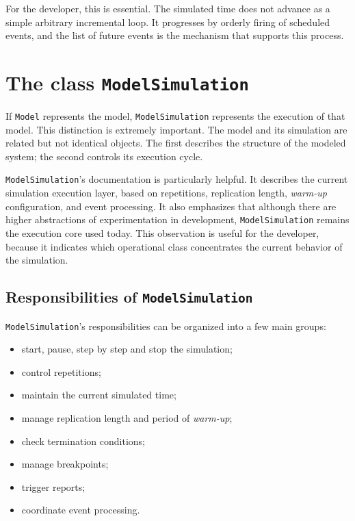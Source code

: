 For the developer, this is essential. The simulated time does not advance as a simple arbitrary incremental loop. It progresses by orderly firing of scheduled events, and the list of future events is the mechanism that supports this process.

\section{The class \texttt{ModelSimulation}}
\label{sec:cap7_classe_modelsimulation}

If \texttt{Model} represents the model, \texttt{ModelSimulation} represents the execution of that model. This distinction is extremely important. The model and its simulation are related but not identical objects. The first describes the structure of the modeled system; the second controls its execution cycle.

\texttt{ModelSimulation}'s documentation is particularly helpful. It describes the current simulation execution layer, based on repetitions, replication length, \textit{warm-up} configuration, and event processing. It also emphasizes that although there are higher abstractions of experimentation in development, \texttt{ModelSimulation} remains the execution core used today. This observation is useful for the developer, because it indicates which operational class concentrates the current behavior of the simulation.

\subsection{Responsibilities of \texttt{ModelSimulation}}
\label{subsec:cap7_responsabilidades_modelsimulation}

\texttt{ModelSimulation}'s responsibilities can be organized into a few main groups:

\begin{itemize}
 \item start, pause, step by step and stop the simulation;
 \item control repetitions;
 \item maintain the current simulated time;
 \item manage replication length and period of \textit{warm-up};
 \item check termination conditions;
 \item manage breakpoints;
 \item trigger reports;
 \item coordinate event processing.
\end{itemize}

